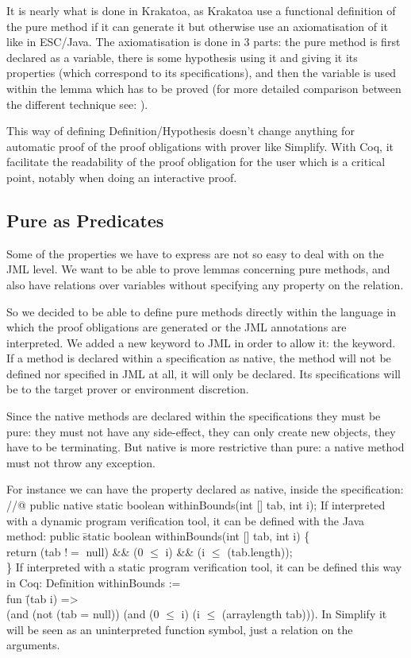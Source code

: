 It is nearly what is done in Krakatoa\cite{MPMU-04-JLAP}, as
Krakatoa use a functional definition of the pure method if it can generate it
but otherwise use an axiomatisation of it like in ESC/Java\cite{COKK-04-ESCJ}.
The axiomatisation is done in 3 parts: the pure method is first declared as a variable, 
there is some hypothesis  using it and giving it its properties (which correspond to its
specifications), and then the variable
is used within the lemma which has to be proved (for more detailed comparison between 
the different technique see: \cite{COK-04-METH,DarvasMueller-05}).

This way of defining Definition/Hypothesis doesn't change anything for automatic 
proof of the proof obligations with prover like Simplify. 
With Coq,
it facilitate the readability of the proof obligation for the user which 
is a critical point, notably when doing an interactive proof.

\subsection{Pure as Predicates}
Some of the properties we have to express are not so easy to deal with on the JML level. 
We want to be able to prove lemmas concerning pure methods, and also have 
relations over  variables without specifying any property on the relation. 

So we decided to be able to define pure methods directly within the language in which the proof 
obligations are generated or the JML annotations are interpreted. 
We added a new keyword to JML in order to allow it: the  keyword. 
If a method is declared within a specification as native, the method will not be defined nor specified
 in JML at all, it will only be declared. Its specifications will be to the target prover or environment 
discretion.

Since the native methods are declared within the specifications they must be pure:
they must not have any side-effect, they can only
create new objects, they have to be terminating. But native is
more restrictive than pure: a native method must not throw any exception.


For instance we can have the property  declared as native, inside the specification:
\btab
//@ public native static boolean withinBounds(int [] tab, int i); 
\etab
If interpreted with a dynamic program verification tool, it
can be defined with the Java method:
\btab
public \= static boolean withinBounds(int [] tab, int i) \{\+\\
    return (tab $!=$ null) \&\& (0 $\le$ i) \&\& (i $\le$ (tab.length));\-\\
\}
\etab
If interpreted with a static program verification tool,
it can be defined this way in Coq:
\btab
Def\=inition withinBounds := \+\\
fun \= (tab i) =>\+\\
       (and (not (tab = null)) (and (0 $\le$ i) (i $\le$ (arraylength tab))).
\etab
In Simplify it will be seen as an uninterpreted function symbol, just a relation on the arguments.

